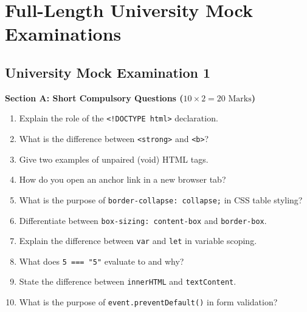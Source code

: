 \chapter{Full-Length University Mock Examinations}
\label{chap:mock-examinations}

\section{University Mock Examination 1}

\begin{mockexam}
\noindent\textbf{Section A: Short Compulsory Questions ($10 \times 2 = 20\text{ Marks}$)}
\begin{enumerate}[leftmargin=1.5em]
    \item Explain the role of the \texttt{<!DOCTYPE html>} declaration.
    \item What is the difference between \texttt{<strong>} and \texttt{<b>}?
    \item Give two examples of unpaired (void) HTML tags.
    \item How do you open an anchor link in a new browser tab?
    \item What is the purpose of \texttt{border-collapse: collapse;} in CSS table styling?
    \item Differentiate between \texttt{box-sizing: content-box} and \texttt{border-box}.
    \item Explain the difference between \texttt{var} and \texttt{let} in variable scoping.
    \item What does \texttt{5 === "5"} evaluate to and why?
    \item State the difference between \texttt{innerHTML} and \texttt{textContent}.
    \item What is the purpose of \texttt{event.preventDefault()} in form validation?
\end{enumerate}


\end{mockexam}
